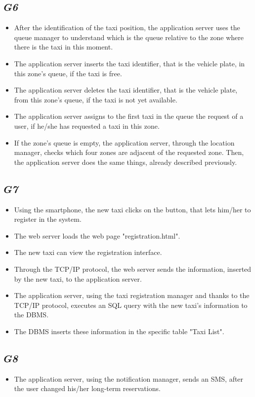 	\subsection {\emph{G6}}
		\begin{itemize}
			\item After the identification of the taxi position, the application server uses the queue manager to understand which is the queue relative to the zone where there is the taxi in this moment.
			\item The application server inserts the taxi identifier, that is the vehicle plate, in this zone's queue, if the taxi is free.
			\item The application server deletes the taxi identifier, that is the vehicle plate, from this zone's queue, if the taxi is not yet available.
			\item The application server assigns to the first taxi in the queue the request of a user, if he/she has requested a taxi in this zone.
			\item If the zone's queue is empty, the application server, through the location manager, checks which four zones are adjacent of the requested zone. Then, the application server does the same things, already described previously.
		\end{itemize}
	\subsection {\emph{G7}}
		\begin{itemize}
			\item Using the smartphone, the new taxi clicks on the button, that lets him/her to register in the system.
			\item The web server loads the web page "registration.html".
			\item The new taxi can view the registration interface.
			\item Through the TCP/IP protocol, the web server sends the information, inserted by the new taxi, to the application server.
			\item The application server, using the taxi registration manager and thanks to the TCP/IP protocol, executes an SQL query with the new taxi's information to the DBMS.
			\item The DBMS inserts these information in the specific table "Taxi List".
		\end{itemize}
	\subsection {\emph{G8}}
		\begin{itemize}
			\item The application server, using the notification manager, sends an SMS, after the user changed his/her long-term reservations.
		\end{itemize}
